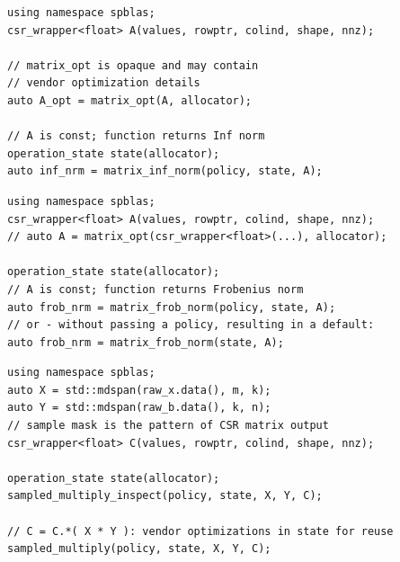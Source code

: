 
\begin{listing}[H]
\caption{Inf Matrix Norm, $\alpha = \|A\|_\text{inf}$.}
\begin{verbatim}
using namespace spblas;
csr_wrapper<float> A(values, rowptr, colind, shape, nnz);

// matrix_opt is opaque and may contain 
// vendor optimization details
auto A_opt = matrix_opt(A, allocator);

// A is const; function returns Inf norm
operation_state state(allocator);
auto inf_nrm = matrix_inf_norm(policy, state, A);
\end{verbatim}
\end{listing}



\begin{listing}[H]
\caption{Frobenius Matrix Norm, $\alpha = \|A\|_F$}
\begin{verbatim}
using namespace spblas;
csr_wrapper<float> A(values, rowptr, colind, shape, nnz);
// auto A = matrix_opt(csr_wrapper<float>(...), allocator);

operation_state state(allocator);
// A is const; function returns Frobenius norm
auto frob_nrm = matrix_frob_norm(policy, state, A);
// or - without passing a policy, resulting in a default:
auto frob_nrm = matrix_frob_norm(state, A);
\end{verbatim}
\end{listing}


\begin{listing}[H]
\caption{Sampled dense dense matrix multiplication (SDDMM), $C\langle \text{mask} \rangle = X\cdot Y$, where the $C$ sparsity pattern encodes the mask}
\begin{verbatim}
using namespace spblas;
auto X = std::mdspan(raw_x.data(), m, k);
auto Y = std::mdspan(raw_b.data(), k, n);
// sample mask is the pattern of CSR matrix output
csr_wrapper<float> C(values, rowptr, colind, shape, nnz);

operation_state state(allocator);
sampled_multiply_inspect(policy, state, X, Y, C);

// C = C.*( X * Y ): vendor optimizations in state for reuse
sampled_multiply(policy, state, X, Y, C); 

\end{verbatim}
\end{listing}



